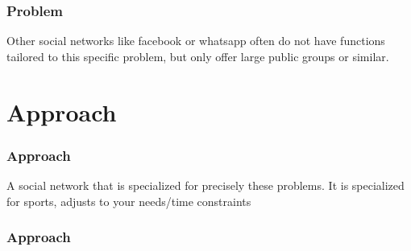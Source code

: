 \documentclass[aspectratio=169]{beamer}
\begin{document}
	\begin{frame}
		\frametitle{Problem}
		Other social networks like facebook or whatsapp often do not have functions tailored to this specific problem, but only offer large public groups or similar. 
	\end{frame}

\section{Approach}

	\begin{frame}
		\frametitle{Approach}
		A social network that is specialized for precisely these problems. It is specialized for sports, adjusts to your needs/time constraints 
	\end{frame}

	\begin{frame}   
		\frametitle{Approach}
		\begin{columns}
			 \begin{figure}
				\centering

\end{figure}
\end{columns}
\end{frame}
\end{document}

